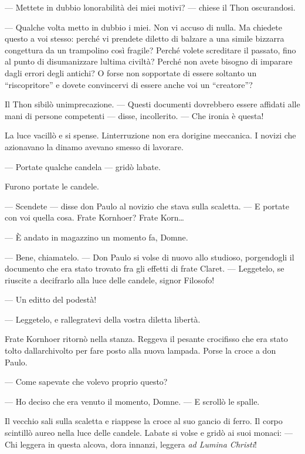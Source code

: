 --- Mettete in dubbio l\textquotesingle onorabilità dei miei motivi? ---
chiese il Thon oscurandosi.

--- Qualche volta metto in dubbio i miei. Non vi accuso di nulla. Ma
chiedete questo a voi stesso: perché vi prendete diletto di balzare a
una simile bizzarra congettura da un trampolino così fragile? Perché
volete screditare il passato, fino al punto di disumanizzare
l\textquotesingle ultima civiltà? Perché non avete bisogno di imparare
dagli errori degli antichi? O forse non sopportate di essere soltanto un
``riscopritore'' e dovete convincervi di essere anche voi un
``creatore''?

Il Thon sibilò un\textquotesingle imprecazione. --- Questi documenti
dovrebbero essere affidati alle mani di persone competenti --- disse,
incollerito. --- Che ironia è questa!

La luce vacillò e si spense. L\textquotesingle interruzione non era
d\textquotesingle origine meccanica. I novizi che azionavano la dinamo
avevano smesso di lavorare.

--- Portate qualche candela --- gridò l\textquotesingle abate.

Furono portate le candele.

--- Scendete --- disse don Paulo al novizio che stava sulla scaletta.
--- E portate con voi quella cosa. Frate Kornhoer? Frate Korn\ldots{}

--- È andato in magazzino un momento fa, Domne.

--- Bene, chiamatelo. --- Don Paulo si volse di nuovo allo studioso,
porgendogli il documento che era stato trovato fra gli effetti di frate
Claret. --- Leggetelo, se riuscite a decifrarlo alla luce delle candele,
signor Filosofo!

--- Un editto del podestà!

--- Leggetelo, e rallegratevi della vostra diletta libertà.

Frate Kornhoer ritornò nella stanza. Reggeva il pesante crocifisso che
era stato tolto dall\textquotesingle archivolto per fare posto alla
nuova lampada. Porse la croce a don Paulo.

--- Come sapevate che volevo proprio questo?

--- Ho deciso che era venuto il momento, Domne. --- E scrollò le spalle.

Il vecchio sali sulla scaletta e riappese la croce al suo gancio di
ferro. Il corpo scintillò aureo nella luce delle candele.
L\textquotesingle abate si volse e gridò ai suoi monaci: --- Chi leggera
in questa alcova, d\textquotesingle ora innanzi, leggera \emph{ad Lumina
	Christi}!

